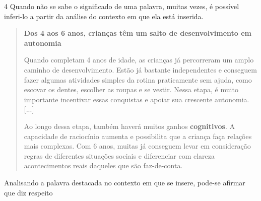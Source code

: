 
\num{4} Quando não se sabe o significado de uma palavra, muitas vezes, é
possível inferi-lo a partir da análise do contexto em que ela está
inserida.

\begin{quote}
\textbf{Dos 4 aos 6 anos, crianças têm um salto de desenvolvimento em autonomia}

Quando completam 4 anos de idade, as crianças já percorreram um amplo
caminho de desenvolvimento. Estão já bastante independentes e conseguem
fazer algumas atividades simples da rotina praticamente sem ajuda, como
escovar os dentes, escolher as roupas e se vestir. Nessa etapa, é muito
importante incentivar essas conquistas e apoiar sua crescente autonomia.
{[}...{]}

Ao longo dessa etapa, também haverá muitos ganhos \textbf{cognitivos}. A
capacidade de raciocínio aumenta e possibilita que a criança faça
relações mais complexas. Com 6 anos, muitas já conseguem levar em
consideração regras de diferentes situações sociais e diferenciar com
clareza acontecimentos reais daqueles que são faz-de-conta.

\end{quote}

Analisando a palavra destacada no contexto em que se insere, 
pode-se afirmar que diz respeito

